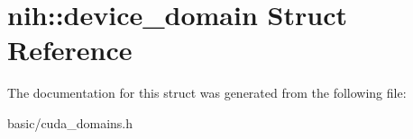 \hypertarget{structnih_1_1device__domain}{
\section{nih\-:\-:device\-\_\-domain \-Struct \-Reference}
\label{structnih_1_1device__domain}
}


\-The documentation for this struct was generated from the following file\-:\begin{DoxyCompactItemize}
\item 
basic/cuda\-\_\-domains.\-h\end{DoxyCompactItemize}
